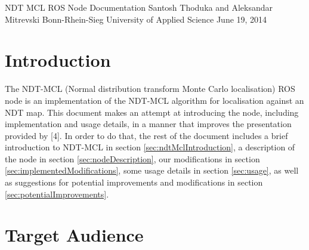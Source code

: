 \documentclass[12pt]{article}
\begin{document}

	\begin{titlepage}
		\vspace*{\fill}
		\begin{center}
			\begin{spacing}{1.5}
				NDT MCL ROS Node Documentation
				\linebreak
				Santosh Thoduka and Aleksandar Mitrevski
				\linebreak
				Bonn-Rhein-Sieg University of Applied Science
				\linebreak \linebreak
				June 19, 2014
			\end{spacing}
		\end{center}
		\vspace*{\fill}
	\end{titlepage}

\setcounter{page}{2}

\newpage
	\setlength{\parindent}{0.0in}

	\renewcommand*\contentsname{\hfill Contents \hfill}
	\tableofcontents

\newpage

	\section{Introduction}
	\label{sec:introduction}

	The NDT-MCL (Normal distribution transform Monte Carlo localisation) ROS node is an implementation of the NDT-MCL algorithm for localisation against an NDT map. This document makes an attempt at introducing the node, including implementation and usage details, in a manner that improves the presentation provided by [4]. In order to do that, the rest of the document includes a brief introduction to NDT-MCL in section \ref{sec:ndtMclIntroduction}, a description of the node in section \ref{sec:nodeDescription}, our modifications in section \ref{sec:implementedModifications}, some usage details in section \ref{sec:usage}, as well as suggestions for potential improvements and modifications in section \ref{sec:potentialImprovements}.

	\section{Target Audience}
	\label{sec:targetAudience}
\end{document}
